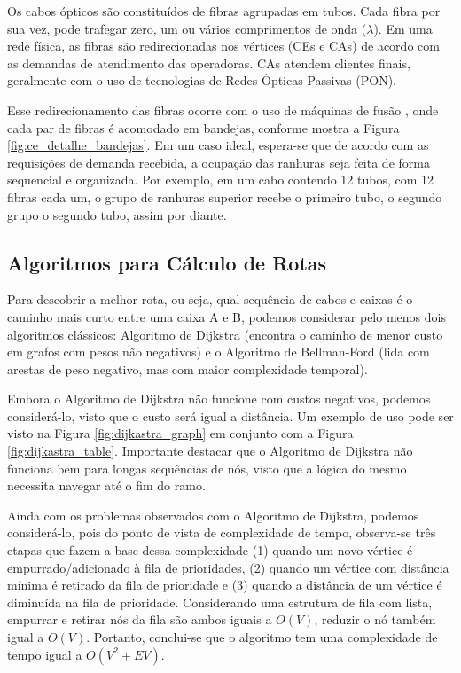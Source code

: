 Os cabos ópticos são constituídos de fibras agrupadas em tubos. Cada fibra por
sua vez, pode trafegar zero, um ou vários comprimentos de onda ($\lambda$).
Em uma rede física, as fibras são redirecionadas nos vértices (CEs e CAs) de
acordo com as demandas de atendimento das operadoras. CAs atendem clientes finais,
geralmente com o uso de tecnologias de Redes Ópticas Passivas (PON).

Esse redirecionamento das fibras ocorre com o uso de máquinas de fusão
\cite{maeda2009optical}, onde cada par de fibras é acomodado em bandejas,
conforme mostra a Figura \ref{fig:ce_detalhe_bandejas}. Em um caso ideal,
espera-se que de acordo com as requisições de demanda recebida, a ocupação das
ranhuras seja feita de forma sequencial e organizada. Por exemplo, em um cabo
contendo 12 tubos, com 12 fibras cada um, o grupo de ranhuras superior recebe
o primeiro tubo, o segundo grupo o segundo tubo, assim por diante.

\subsection{Algoritmos para Cálculo de Rotas}

Para descobrir a melhor rota, ou seja, qual sequência de cabos e caixas é o
caminho mais curto entre uma caixa A e B, podemos considerar pelo menos dois
algoritmos clássicos: Algoritmo de Dijkstra (encontra o caminho de menor custo
em grafos com pesos não negativos) \cite{dijkstra2022note} e o Algoritmo de
Bellman-Ford (lida com arestas de peso negativo, mas com maior complexidade
temporal).

Embora o Algoritmo de Dijkstra não funcione com custos negativos, podemos
considerá-lo, visto que o custo será igual a distância. Um exemplo de uso pode
ser visto na Figura \ref{fig:dijkastra_graph} em conjunto com a Figura
\ref{fig:dijkastra_table}. Importante destacar que o Algoritmo de Dijkstra não
funciona bem para longas sequências de nós, visto que a lógica do mesmo
necessita navegar até o fim do ramo.

Ainda com os problemas observados com o Algoritmo de Dijkstra, podemos
considerá-lo, pois do ponto de vista de complexidade de tempo, observa-se três
etapas que fazem a base dessa complexidade (1) quando um novo vértice é
empurrado/adicionado à fila de prioridades, (2) quando um vértice com distância
mínima é retirado da fila de prioridade e (3) quando a distância de um vértice
é diminuída na fila de prioridade. Considerando uma estrutura de fila com
lista, empurrar e retirar nós da fila são ambos iguais a $O(V)$, reduzir o nó
também igual a $O(V)$. Portanto, conclui-se que o algoritmo tem uma
complexidade de tempo igual a $O(V^2 + EV)$.


